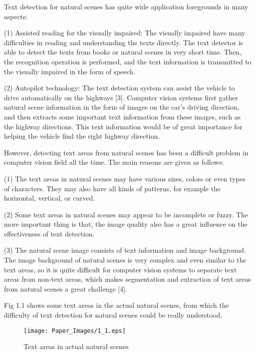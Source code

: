 \documentclass[22pt, UTF8]{article}
\numberwithin{figure}{section}
\numberwithin{table}{section}
\numberwithin{equation}{section} %
\begin{document}
\setlength\parindent{2em} Text detection for natural scenes has quite wide application foregrounds in many aspects:

\setlength\parindent{2em} (1) Assisted reading for the visually impaired: The visually impaired have many difficulties in reading and understanding the texts directly. The text detector is able to detect the texts from books or natural scenes in very short time. Then, the recognition operation is performed, and the text information is transmitted to the visually impaired in the form of speech.

\setlength\parindent{2em} (2) Autopilot technology: The text detection system can assist the vehicle to drive automatically on the highways [3]. Computer vision systems first gather natural scene information in the form of images on the car's driving direction, and then extracts some important text information from these images, such as the highway directions. This text information would be of great importance for helping the vehicle find the right highway direction.

\setlength\parindent{2em} However, detecting text areas from natural scenes has been a difficult problem in computer vision field all the time. The main reasons are given as follows:

\setlength\parindent{2em} (1) The text areas in natural scenes may have various sizes, colors or even types of characters. They may also have all kinds of patterns, for example the horizontal, vertical, or curved.

\setlength\parindent{2em} (2) Some text areas in natural scenes may appear to be incomplete or fuzzy. The more important thing is that, the image quality also has a great influence on the effectiveness of text detection.

\setlength\parindent{2em} (3) The natural scene image consists of text information and image background. The image background of natural scenes is very complex and even similar to the text areas, so it is quite difficult for computer vision systems to separate text areas from non-text areas, which makes segmentation and extraction of text areas from natural scenes a great challenge [4].

\setlength\parindent{2em} Fig 1.1 shows some text areas in the actual natural scenes, from which the difficulty of text detection for natural scenes could be really understood.

\begin{figure}[htbp] %
    \begin{center}
        \texttt{[image: Paper\_Images/1\_1.eps]}
    \end{center}
    \vspace{-3mm} %
    \caption{Text areas in actual natural scenes} %
    \vspace{-4mm} %
\end{figure}
\end{document}
